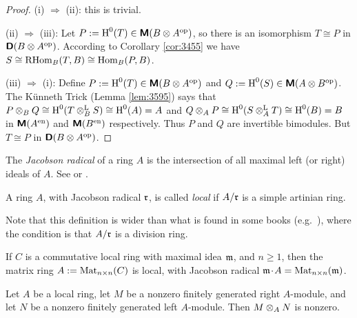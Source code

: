 \begin{proof} \mbox{} 

\smallskip \noindent 
(i) $\Rightarrow$ (ii): this is trivial.

\medskip \noindent
(ii) $\Rightarrow$ (iii): 
Let $P := \operatorname{H}^0(T) \in \boldsymbol{\mathsf{M}}(B \otimes A^{\mathrm{op}})$,
so there is an isomorphism 
$T \cong P$ in $\boldsymbol{\mathsf{D}}(B \otimes A^{\mathrm{op}})$.
According to Corollary \ref{cor:3455} we have 
$S \cong \operatorname{RHom}_B(T, B) \cong \operatorname{Hom}_B(P, B)$.

\medskip \noindent
(iii) $\Rightarrow$ (i): 
Define $P := \operatorname{H}^{0}(T) \in \boldsymbol{\mathsf{M}}(B \otimes A^{\mathrm{op}})$
and $Q := \operatorname{H}^{0}(S) \in \boldsymbol{\mathsf{M}}(A \otimes B^{\mathrm{op}})$.
The K\"unneth Trick (Lemma \ref{lem:3595}) says that 
$P \otimes_B Q \cong \operatorname{H}^{0}(T \otimes^{\mathrm{L}}_{B} S) \cong \operatorname{H}^{0}(A) = A$
and
$Q \otimes_A P \cong \operatorname{H}^{0}(S \otimes^{\mathrm{L}}_{A} T) \cong \operatorname{H}^{0}(B) = B$
in $\boldsymbol{\mathsf{M}}(A^{\mathrm{en}})$ and $\boldsymbol{\mathsf{M}}(B^{\mathrm{en}})$ respectively. 
Thus $P$ and $Q$ are invertible bimodules. 
But $T \cong P$ in $\boldsymbol{\mathsf{D}}(B \otimes A^{\mathrm{op}})$. 
\end{proof}

The {\em Jacobson radical} of a ring $A$ is the intersection of all 
maximal left (or right) ideals of $A$. See \cite[Section 4.4.2]{Jac} or 
\cite[Section 2.5]{Row}. 

\begin{dfn}
A ring $A$, with Jacobson radical $\mathfrak{r}$, is called {\em local} 
if $A / \mathfrak{r}$ is a simple artinian ring. 
\end{dfn}

Note that this definition is wider than what is found in some books (e.g.\ 
\cite{Row}), where the condition is that $A / \mathfrak{r}$ is a division ring. 

\begin{exa} \label{exa:3575}
If $C$ is a commutative local ring with maximal idea $\mathfrak{m}$, and $n \geq 1$, 
then the matrix ring $A := \operatorname{Mat}_{n \times n}(C)$ is local, with Jacobson 
radical $\mathfrak{m} \mspace{1.5mu}{\cdot}\mspace{1.5mu} A = \operatorname{Mat}_{n \times n}(\mathfrak{m})$.  
\end{exa}

\begin{lem} \label{lem:3575}
Let $A$ be a local ring, let $M$ be a nonzero finitely generated right 
$A$-module, and let $N$ be a nonzero finitely generated left $A$-module. Then 
$M \otimes_A N$ is nonzero. 
\end{lem}

